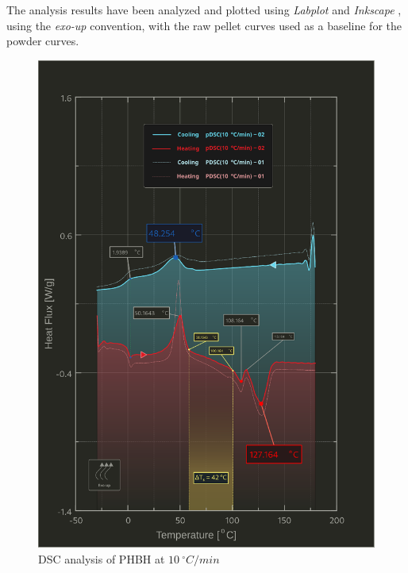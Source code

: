 \documentclass{article}
\begin{document}
                The analysis results have been analyzed and plotted using \textit{Labplot} \autocites{Labplot} 
                and \textit{Inkscape} \autocites{Inkscape},
                using the \textit{exo-up} convention, with the raw pellet curves used as a baseline for the powder curves. \\

                    \begin{figure}[h!]
                        \includegraphics[width=\textwidth]{Pictures/Thermal_analysis_plots/DSC_alberto.eps}
                        \caption{DSC analysis of PHBH at $10 \ ^{\circ}C/min$}
                        \label{fig:DSC_10Cmin}
                    \end{figure}
\end{document}
